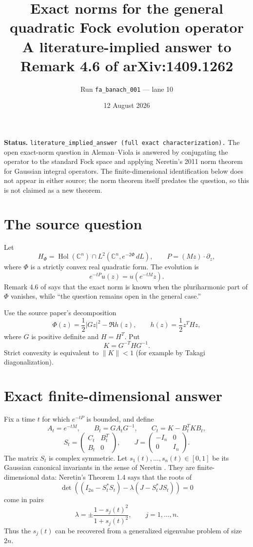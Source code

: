 \documentclass[11pt]{article}
\title{Exact norms for the general quadratic Fock evolution operator\\
\large A literature-implied answer to Remark 4.6 of arXiv:1409.1262}
\author{Run \texttt{fa\_banach\_001} --- lane 10}
\date{12 August 2026}
\newcommand{\C}{\mathbb C}
\begin{document}
\maketitle

\textbf{Status.} \textcolor{statusblue}{\texttt{literature\_implied\_answer
(full exact characterization).}}
The open exact-norm question in Aleman--Viola is answered by conjugating the
operator to the standard Fock space and applying Neretin's 2011 norm theorem
for Gaussian integral operators.  The finite-dimensional identification
below does not appear in either source; the norm theorem itself predates the
question, so this is not claimed as a new theorem.

\section*{The source question}

Let
\[
 H_\Phi=\operatorname{Hol}(\C^n)\cap
 L^2(\C^n,e^{-2\Phi}\,dL),\qquad
 P=(Mz)\mathbin\cdot\partial_z,
\]
where \(\Phi\) is a strictly convex real quadratic form.  The evolution is
\[
  e^{-tP}u(z)=u(e^{-tM}z).
\]
Remark 4.6 of \cite{AV} says that the exact norm is known when the
pluriharmonic part of \(\Phi\) vanishes, while ``the question remains open in
the general case.''

Use the source paper's decomposition
\[
 \Phi(z)=\frac12|Gz|^2-\Re h(z),\qquad
 h(z)=\frac12z^T H z,
\]
where \(G\) is positive definite and \(H=H^T\).  Put
\[
 K=G^{-T}HG^{-1}.
\]
Strict convexity is equivalent to \(\|K\|<1\) (for example by Takagi
diagonalization).

\section*{Exact finite-dimensional answer}

Fix a time \(t\) for which \(e^{-tP}\) is bounded, and define
\[
 A_t=e^{-tM},\qquad B_t=GA_tG^{-1},\qquad
 C_t=K-B_t^T K B_t,
\]
\[
 S_t=\begin{pmatrix}C_t&B_t^T\\ B_t&0\end{pmatrix},
 \qquad J=\begin{pmatrix}-I_n&0\\0&I_n\end{pmatrix}.
\]
The matrix \(S_t\) is complex symmetric.  Let
\(s_1(t),\ldots,s_n(t)\in[0,1]\) be its Gaussian canonical invariants in
the sense of Neretin \cite[Chapter 6, Theorem 1.3]{Neretin}.  They are
finite-dimensional data: Neretin's Theorem 1.4 says that the roots of
\[
 \det\!\left((I_{2n}-S_t^*S_t)
 -\lambda(J-S_t^*JS_t)\right)=0                         \tag{1}
\]
come in pairs
\[
 \lambda=\pm\frac{1-s_j(t)^2}{1+s_j(t)^2},
 \qquad j=1,\ldots,n.                                  \tag{2}
\]
Thus the \(s_j(t)\) can be recovered from a generalized eigenvalue problem
of size \(2n\).
\end{document}
